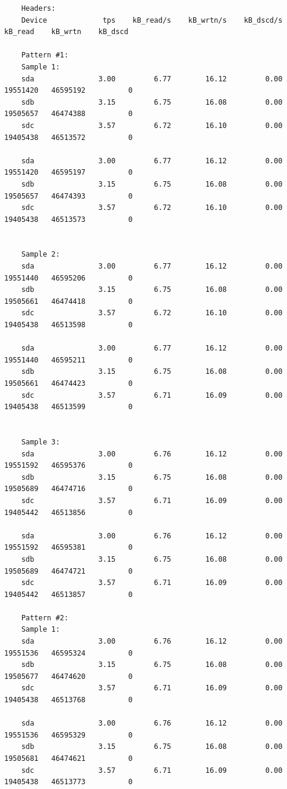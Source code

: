 \documentclass{article}
\begin{document}
\begin{verbatim}
	Headers:
	Device             tps    kB_read/s    kB_wrtn/s    kB_dscd/s    kB_read    kB_wrtn    kB_dscd

	Pattern #1:
	Sample 1:
	sda               3.00         6.77        16.12         0.00   19551420   46595192          0
	sdb               3.15         6.75        16.08         0.00   19505657   46474388          0
	sdc               3.57         6.72        16.10         0.00   19405438   46513572          0

	sda               3.00         6.77        16.12         0.00   19551420   46595197          0
	sdb               3.15         6.75        16.08         0.00   19505657   46474393          0
	sdc               3.57         6.72        16.10         0.00   19405438   46513573          0


	Sample 2:
	sda               3.00         6.77        16.12         0.00   19551440   46595206          0
	sdb               3.15         6.75        16.08         0.00   19505661   46474418          0
	sdc               3.57         6.72        16.10         0.00   19405438   46513598          0

	sda               3.00         6.77        16.12         0.00   19551440   46595211          0
	sdb               3.15         6.75        16.08         0.00   19505661   46474423          0
	sdc               3.57         6.71        16.09         0.00   19405438   46513599          0


	Sample 3:
	sda               3.00         6.76        16.12         0.00   19551592   46595376          0
	sdb               3.15         6.75        16.08         0.00   19505689   46474716          0
	sdc               3.57         6.71        16.09         0.00   19405442   46513856          0

	sda               3.00         6.76        16.12         0.00   19551592   46595381          0
	sdb               3.15         6.75        16.08         0.00   19505689   46474721          0
	sdc               3.57         6.71        16.09         0.00   19405442   46513857          0

	Pattern #2:
	Sample 1:
	sda               3.00         6.76        16.12         0.00   19551536   46595324          0
	sdb               3.15         6.75        16.08         0.00   19505677   46474620          0
	sdc               3.57         6.71        16.09         0.00   19405438   46513768          0

	sda               3.00         6.76        16.12         0.00   19551536   46595329          0
	sdb               3.15         6.75        16.08         0.00   19505681   46474621          0
	sdc               3.57         6.71        16.09         0.00   19405438   46513773          0



\end{verbatim}
\end{document}
